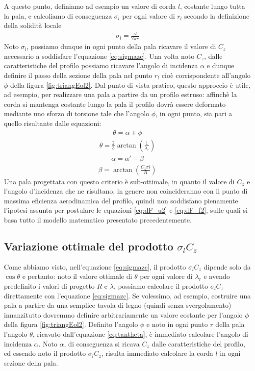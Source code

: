 A questo punto, definiamo ad esempio un valore di corda $l$, costante lungo  tutta la pala, e calcoliamo di conseguenza $\sigma_l$ per ogni valore di $r_l$ secondo la definizione della solidità locale
\begin{align*}
\sigma_l = \frac{z l}{2 \pi r}
\end{align*}
Noto $\sigma_l$, possiamo dunque in ogni punto della pala ricavare il valore di $C_z$ necessario a soddisfare l'equazione \ref{eq:sigmazc}. Una volta noto $C_z$, dalle caratteristiche del profilo possiamo ricavare l'angolo di incidenza $\alpha$ e dunque definire il passo della sezione della pala nel punto $r_l$ cioè corrispondente all'angolo $\phi$ della figura \ref{fig:triangEol2}. Dal punto di vista pratico, questo approccio è utile, ad esempio, per realizzare una pala a partire da un profilo estruso: affinchè la corda si mantenga costante lungo la pala il profilo dovrà essere deformato mediante uno sforzo di torsione tale che l'angolo $\phi$, in ogni punto, sia pari a quello risultante dalle equazioni:
\begin{align*}
\theta = \alpha + \phi
\end{align*}
\begin{align*}
\theta = \frac{2}{3} \arctan \left( \frac{1}{\lambda_r} \right)
\end{align*}
\begin{align*}
\alpha = \alpha' - \beta
\end{align*}
\begin{align*}
\beta = \arctan \left( \frac{C_z \pi l}{R} \right)
\end{align*}
Una pala progettata con questo criterio è sub-ottimale, in quanto il valore di $C_z$ e l'angolo d'incidenza che ne risultano, in genere non coincideranno con il punto di massima eficienza aerodinamica del profilo, quindi non soddisfano pienamente l'ipotesi assunta per postulare le equazioni \ref{eq:dF_u2} e \ref{eq:dF_f2}, sulle quali si basa tutto il modello matematico presentato precedentemente.

\subsection{Variazione ottimale del prodotto $\sigma_l C_z$}
Come abbiamo visto, nell'equazione \ref{eq:sigmazc}, il prodotto $\sigma_l C_z$ dipende solo da $\cos \theta$ e pertanto: noto il valore ottimale di $\theta$ per ogni valore di $\lambda_r$ e avendo predefinito i valori di progetto $R$ e $\lambda$, possiamo calcolare il prodotto $\sigma_l C_z$ direttamente con l'equazione \ref{eq:sigmazc}. Se volessimo, ad esempio, costruire una pala a partire da una semplice tavola di legno (quindi senza svergolamento) innanzitutto dovremmo definire arbitrariamente un valore costante per l'angolo $\phi$ della figura \ref{fig:triangEol2}. Definito l'angolo $\phi$ e noto in ogni punto $r$ della pala l'angolo $\theta$, ricavato dall'equazione \ref{eq:tantheta}, è immediato calcolare l'angolo di incidenza $\alpha$. Noto $\alpha$, di conseguenza si ricava $C_z$ dalle caratteristiche del profilo, ed essendo noto il prodotto $\sigma_l C_z$, risulta immediato calcolare la corda $l$ in ogni sezione della pala.


